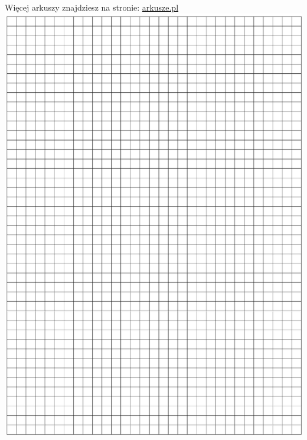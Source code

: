 \documentclass[10pt]{article}
\begin{document}
Więcej arkuszy znajdziesz na stronie: \href{http://arkusze.pl}{arkusze.pl}\\
\includegraphics[max width=\textwidth, center]{2024_11_21_8206013b40ecc9b11a30g-12}\\
\end{document}
